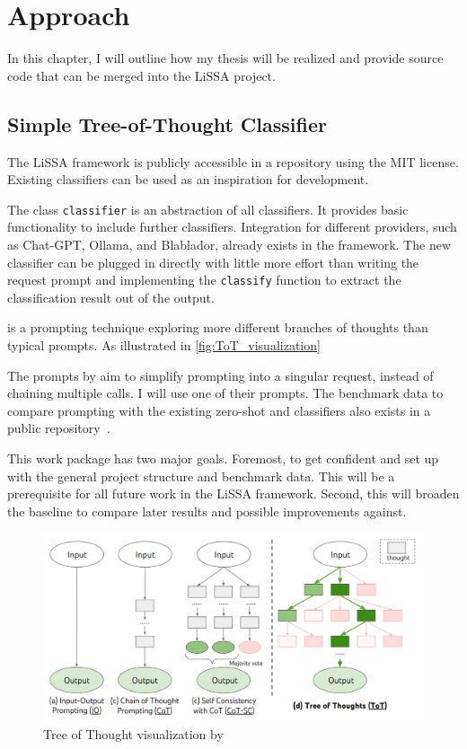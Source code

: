 \chapter{Approach}
In this chapter, I will outline how my thesis will be realized and provide source code that can be merged into the LiSSA project.


\section{Simple Tree-of-Thought Classifier}
\label{approach:sec:tot}
The LiSSA framework is publicly accessible in a repository using the MIT license. Existing classifiers can be used as an inspiration for development. 

The class \verb|classifier| is an abstraction of all classifiers. It provides basic functionality to include further classifiers. Integration for different \LLM providers, such as Chat-GPT, Ollama, and Blablador, already exists in the framework. The new classifier can be plugged in directly with little more effort than writing the request prompt and implementing the \verb|classify| function to extract the classification result out of the \LLM output.

\ToT is a prompting technique exploring more different branches of thoughts than typical \CoT prompts. As illustrated in \autoref{fig:ToT_visualization} 

The prompts by  aim to simplify \ToT prompting into a singular request, instead of chaining multiple calls. I will use one of their prompts. The benchmark data to compare \ToT prompting with the existing zero-shot and \CoT classifiers also exists in a public repository~\cite{fuchss2022ArDoCoBenchmark}.

This work package has two major goals. Foremost, to get confident and set up with the general project structure and benchmark data. This will be a prerequisite for all future work in the LiSSA framework. Second, this will broaden the baseline to compare later results and possible improvements against.

\begin{figure}
    \centering
    \includegraphics[width=\linewidth]{graphics/ToT_Yao}
    \caption{Tree of Thought visualization by }
    \label{fig:ToT_visualization}
\end{figure}

